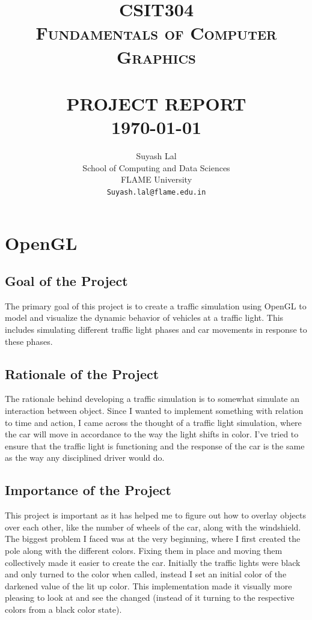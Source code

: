 \documentclass[ fontsize=11pt,twoside]{scrartcl}	%
\title{	\Large \textsc{ CSIT304\\ Fundamentals of Computer Graphics  } 	%
		 	\\[2.0cm]								%
			\HRule{2pt} \\						%
			\LARGE \textbf{\uppercase{Project Report
   }}	%
			\HRule{2pt} \\ [0.5cm]		%
			\Large \today			%
		}
\author{
		Suyash Lal\\	
		School of Computing and Data Sciences\\	
        FLAME University \\
        \texttt{Suyash.lal@flame.edu.in} \\
}
\makeatletter
\def\printtitle{%
    {\centering \@title\par}}
\def\printauthor{%
    {\centering \Large \@author}}
\makeatother
\begin{document}
\thispagestyle{empty}		%

\printtitle					%
  	\vfill
\printauthor				%
\newpage
\setcounter{page}{1}		%



\section{OpenGL}
\subsection{Goal of the Project}
The primary goal of this project is to create a traffic simulation using OpenGL to model and visualize the dynamic behavior of vehicles at a traffic light. This includes simulating different traffic light phases and car movements in response to these phases.

\subsection{Rationale of the Project}
The rationale behind developing a traffic simulation is to somewhat simulate an interaction between object. Since I wanted to implement something with relation to time and action, I came across the thought of a traffic light simulation, where the car will move in accordance to the way the light shifts in color. I've tried to ensure that the traffic light is functioning and the response of the car is the same as the way any disciplined driver would do.

\subsection{Importance of the Project}
This project is important as it has helped me to figure out how to overlay objects over each other, like the number of wheels of the car, along with the windshield. The biggest problem I faced was at the very beginning, where I first created the pole along with the different colors. Fixing them in place and moving them collectively made it easier to create the car. Initially the traffic lights were black and only turned to the color when called, instead I set an initial color of the darkened value of the lit up color. This implementation made it visually more pleasing to look at and see the changed (instead of it turning to the respective colors from a black color state).
\end{document}
